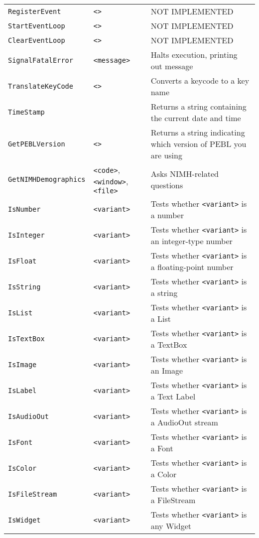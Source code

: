 \begin{longtable}{p{3cm}p{3cm}p{6cm}}
\verb+RegisterEvent+ &\verb+<>+ & NOT IMPLEMENTED\\ 
\verb+StartEventLoop+ &\verb+<>+ & NOT IMPLEMENTED\\ 
\verb+ClearEventLoop+ &\verb+<>+ & NOT IMPLEMENTED\\ 
\verb+SignalFatalError+ &\verb+<message>+ & Halts execution, printing out message \\ 
\verb+TranslateKeyCode+ &\verb+<>+ &Converts a keycode to a key name\\ 
\verb+TimeStamp+ & &Returns a string containing the current date and time\\ 
\verb+GetPEBLVersion+ &\verb+<>+ &Returns a string indicating which version of PEBL you are using\\ 
\verb+GetNIMHDemographics+ & \hspace{0.7cm}\verb+<code>+, \verb+<window>+, \verb+<file>+ & Asks NIMH-related questions\\ 

\verb+IsNumber+ & \verb+<variant>+ & Tests whether \verb+<variant>+ is a number \\ 
\verb+IsInteger+ & \verb+<variant>+ & Tests whether \verb+<variant>+ is an integer-type number\\ 
\verb+IsFloat+ & \verb+<variant>+ & Tests whether \verb+<variant>+ is a floating-point number\\ 
\verb+IsString+ & \verb+<variant>+ & Tests whether \verb+<variant>+ is a string\\ 
\verb+IsList+ & \verb+<variant>+ & Tests whether \verb+<variant>+ is a List\\ 
\verb+IsTextBox+ & \verb+<variant>+ & Tests whether \verb+<variant>+ is a TextBox\\ 
\verb+IsImage+ & \verb+<variant>+ & Tests whether \verb+<variant>+ is an Image\\ 
\verb+IsLabel+ & \verb+<variant>+ & Tests whether \verb+<variant>+ is a Text Label\\ 
\verb+IsAudioOut+ & \verb+<variant>+ & Tests whether \verb+<variant>+ is a AudioOut stream\\ 
\verb+IsFont+ & \verb+<variant>+ & Tests whether \verb+<variant>+ is a Font\\ 
\verb+IsColor+ & \verb+<variant>+ & Tests whether \verb+<variant>+ is a Color\\ 
\verb+IsFileStream+ & \verb+<variant>+ & Tests whether \verb+<variant>+ is a FileStream\\ 
\verb+IsWidget+ & \verb+<variant>+ & Tests whether \verb+<variant>+ is any Widget\\ 


\end{longtable}
